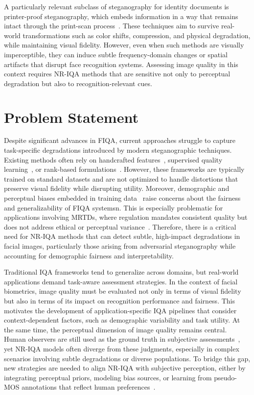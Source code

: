 A particularly relevant subclass of steganography for identity documents is printer-proof steganography, which embeds information in a way that remains intact through the print-scan process~\cite{codeface2021, stegastamp2020}. These techniques aim to survive real-world transformations such as color shifts, compression, and physical degradation, while maintaining visual fidelity. However, even when such methods are visually imperceptible, they can induce subtle frequency-domain changes or spatial artifacts that disrupt face recognition systems. Assessing image quality in this context requires NR-IQA methods that are sensitive not only to perceptual degradation but also to recognition-relevant cues.


\section{Problem Statement}\label{sec:problem_statement}

Despite significant advances in FIQA, current approaches struggle to capture task-specific degradations introduced by modern steganographic techniques. Existing methods often rely on handcrafted features~\cite{henniger2020biosig}, supervised quality learning~\cite{hernandez2019faceqnet, meng2021magface, terhorst2020serfiq}, or rank-based formulations~\cite{liu2017rankiqa}. However, these frameworks are typically trained on standard datasets and are not optimized to handle distortions that preserve visual fidelity while disrupting utility. Moreover, demographic and perceptual biases embedded in training data~\cite{babnik2022} raise concerns about the fairness and generalizability of FIQA systemsn. This is especially problematic for applications involving MRTDs, where regulation mandates consistent quality but does not address ethical or perceptual variance~\cite{icao_2015, iso_iec29794-5_2010}. Therefore, there is a critical need for NR-IQA methods that can detect subtle, high-impact degradations in facial images, particularly those arising from adversarial steganography while accounting for demographic fairness and interpretability.

Traditional IQA frameworks tend to generalize across domains, but real-world applications demand task-aware assessment strategies. In the context of facial biometrics, image quality must be evaluated not only in terms of visual fidelity but also in terms of its impact on recognition performance and fairness. This motivates the development of application-specific IQA pipelines that consider context-dependent factors, such as demographic variability and task utility. At the same time, the perceptual dimension of image quality remains central. Human observers are still used as the ground truth in subjective assessments~\cite{ITU-R-BT500, mos2016}, yet NR-IQA models often diverge from these judgments, especially in complex scenarios involving subtle degradations or diverse populations. To bridge this gap, new strategies are needed to align NR-IQA with subjective perception, either by integrating perceptual priors, modeling bias sources, or learning from pseudo-MOS annotations that reflect human preferences~\cite{chen2021pseudo, jin2020pipal}.

